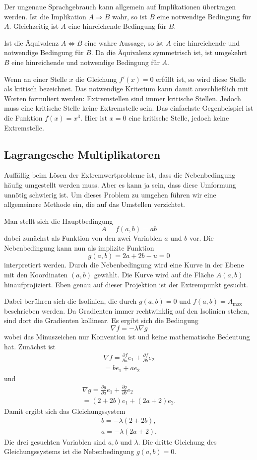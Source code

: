 \documentclass[a4paper,11pt,fleqn,twocolumn]{article}
\begin{document}
Der ungenaue Sprachgebrauch kann allgemein auf Implikationen
übertragen werden. Ist die Implikation
\(A\Rightarrow B\)
wahr, so ist \(B\) eine notwendige Bedingung für \(A\).
Gleichzeitig ist \(A\) eine hinreichende Bedingung für \(B\).

Ist die Äquivalenz \(A\Leftrightarrow B\) eine wahre Aussage, so ist
\(A\) eine hinreichende und notwendige Bedingung für \(B\). Da die
Äquivalenz symmetrisch ist, ist umgekehrt \(B\) eine hinreichende
und notwendige Bedingung für \(A\).

Wenn an einer Stelle \(x\) die Gleichung \(f'(x)=0\) erfüllt ist,
so wird diese Stelle als kritisch bezeichnet. Das notwendige
Kriterium kann damit ausschließlich mit Worten formuliert werden:
Extremstellen sind immer kritische Stellen. Jedoch muss eine kritische
Stelle keine Extremstelle sein. Das einfachste Gegenbeispiel ist
die Funktion \(f(x)=x^3\). Hier ist \(x=0\) eine kritische Stelle,
jedoch keine Extremstelle.

\subsection*{Lagrangesche Multiplikatoren}

Auffällig beim Lösen der Extremwertprobleme ist, dass die
Nebenbedingung häufig umgestellt werden muss. Aber es kann ja sein,
dass diese Umformung unnötig schwierig ist. Um dieses Problem zu
umgehen führen wir eine allgemeinere Methode ein, die auf das
Umstellen verzichtet.

Man stellt sich die
Hauptbedingung
\[A=f(a,b)=ab\]
dabei zunächst als Funktion von den zwei
Variablen \(a\) und \(b\) vor. Die Nebenbedingung kann nun als
implizite Funktion
\[g(a,b)=2a+2b-u=0\]
interpretiert werden. Durch die
Nebenbedingung wird eine Kurve in der Ebene mit den Koordinaten
\((a,b)\) gewählt. Die Kurve wird auf die Fläche \(A(a,b)\)
hinaufprojiziert. Eben genau auf dieser Projektion ist der
Extrempunkt gesucht.

Dabei berühren sich die Isolinien, die durch \(g(a,b)=0\) und
\(f(a,b)=A_\mathrm{max}\) beschrieben werden. Da Gradienten immer
rechtwinklig auf den Isolinien stehen, sind dort die Gradienten
kollinear. Es ergibt sich die Bedingung
\[\nabla f = -\lambda\nabla g\]
wobei das Minuszeichen nur Konvention ist und keine mathematische
Bedeutung hat. Zunächst ist
\begin{gather*}
\nabla f = \frac{\partial f}{\partial a}e_1
+\frac{\partial f}{\partial b}e_2\\
= be_1+ae_2
\end{gather*}
und
\begin{gather*}
\nabla g = \frac{\partial g}{\partial a}e_1
+\frac{\partial g}{\partial b}e_2\\
= (2+2b)e_1+(2a+2)e_2.
\end{gather*}
Damit ergibt sich das Gleichungssystem
\begin{gather*}
b=-\lambda (2+2b),\\
a=-\lambda (2a+2).
\end{gather*}
Die drei gesuchten Variablen sind \(a,b\) und \(\lambda\).
Die dritte Gleichung des Gleichungssystems ist die Nebenbedingung
\(g(a,b)=0\).
\end{document}
